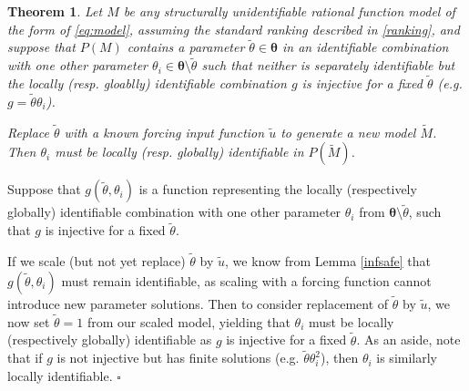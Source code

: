 \documentclass[a4paper,fleqn]{cas-dc}
\newtheorem{theorem}{Theorem}
\theoremstyle{definition}
\begin{document}
\begin{theorem} \label{replace_1d_FINAL}
    Let $M$ be any structurally unidentifiable rational function model of the form of \cref{eq:model}, assuming the standard ranking described in \cref{ranking}, and suppose that $P(M)$ contains a parameter $\tilde{\theta} \in \pmb{\theta}$ in an identifiable combination with one other parameter $\theta_i \in \pmb{\theta}\setminus \tilde{\theta}$ such that neither is separately identifiable but the locally (resp. gloablly) identifiable combination $g$ is injective for a fixed $\tilde{\theta}$ (e.g. $g = \tilde{\theta}\theta_i$). %
 
    Replace $\tilde{\theta}$ with a known forcing input function $\tilde{u}$ to generate a new model $\tilde{M}$. 
    Then $\theta_i$ must be locally (resp. globally) identifiable in $P(\tilde{M})$.
\end{theorem}
\begin{pf}
    Suppose that $g(\tilde{\theta}, \theta_i)$ is a function representing the locally (respectively globally) identifiable combination with one other parameter $\theta_i$ from $\pmb{\theta}\setminus \tilde{\theta}$, such that $g$ is injective for a fixed $\tilde{\theta}$.

    If we scale (but not yet replace) $\tilde{\theta}$ by $\tilde{u}$, we know from Lemma \ref{infsafe} that $g(\tilde{\theta}, \theta_i)$ must remain identifiable, as scaling with a forcing function cannot introduce new parameter solutions. Then to consider replacement of $\tilde{\theta}$ by $\tilde{u}$, we now set $\tilde{\theta}=1$ from our scaled model, yielding that $\theta_i$ must be locally (respectively globally) identifiable as $g$ is injective for a fixed $\tilde{\theta}$. As an aside, note that if $g$ is not injective but has finite solutions (e.g. $\tilde{\theta}\theta_i^2$), then $\theta_i$ is similarly locally identifiable. $\square$ 
\end{pf}
\end{document}
